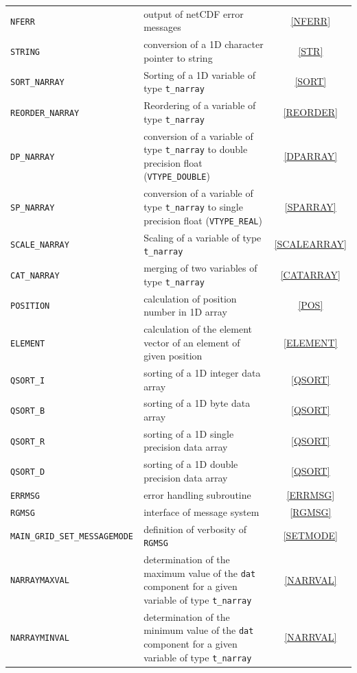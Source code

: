 \documentclass[11pt,twoside]{article}
\begin{document}
\begin{longtable}{|p{5cm}p{8.5cm}c|}
\color{blue} \tt NFERR & output of netCDF error messages & \ref{NFERR}\\
\color{blue} \tt STRING & conversion of a 1D character pointer to string & \ref{STR}\\
\color{blue} \tt SORT\_NARRAY & Sorting of a 1D variable of
type \verb|t_narray|& \ref{SORT}\\
\color{blue} \tt REORDER\_NARRAY & Reordering of a variable of
type \verb|t_narray|& \ref{REORDER}\\
\color{blue} \tt DP\_NARRAY & conversion of a variable of type \verb|t_narray|
 to double precision float (\verb|VTYPE_DOUBLE|) & \ref{DPARRAY}\\
\color{blue} \tt SP\_NARRAY & conversion of a variable of type \verb|t_narray|
 to single precision float (\verb|VTYPE_REAL|) & \ref{SPARRAY}\\
\color{blue} \tt SCALE\_NARRAY & Scaling of a variable of type \verb|t_narray| & \ref{SCALEARRAY}\\
\color{blue} \tt CAT\_NARRAY & merging of two variables of type \verb|t_narray| & \ref{CATARRAY}\\
\color{blue} \tt POSITION & calculation of position number in 1D array & \ref{POS}\\
\color{blue} \tt ELEMENT & calculation of the element vector of an
element of given position & \ref{ELEMENT}\\
\color{blue} \tt QSORT\_I & sorting of a 1D integer data array & \ref{QSORT}\\
\color{blue} \tt QSORT\_B & sorting of a 1D byte data array & \ref{QSORT}\\
\color{blue} \tt QSORT\_R & sorting of a 1D single precision data array & \ref{QSORT}\\
\color{blue} \tt QSORT\_D & sorting of a 1D double precision data array & \ref{QSORT}\\
\color{blue} \tt ERRMSG & error handling subroutine & \ref{ERRMSG}\\
\color{blue} \tt RGMSG & interface of message system & \ref{RGMSG}\\
\color{blue} \tt MAIN\_GRID\_SET\_MESSAGEMODE & definition of
verbosity of \verb|RGMSG| & \ref{SETMODE}\\
\color{blue} \tt {NARRAYMAXVAL} & determination of the maximum  value
of the \verb|dat|
component for a given variable of type \verb|t_narray| & \ref{NARRVAL}\\
\color{blue} \tt {NARRAYMINVAL} &  determination of the minimum  value
of the \verb|dat|
component for a given variable of type \verb|t_narray| & \ref{NARRVAL}\\

\end{longtable}
\end{document}
